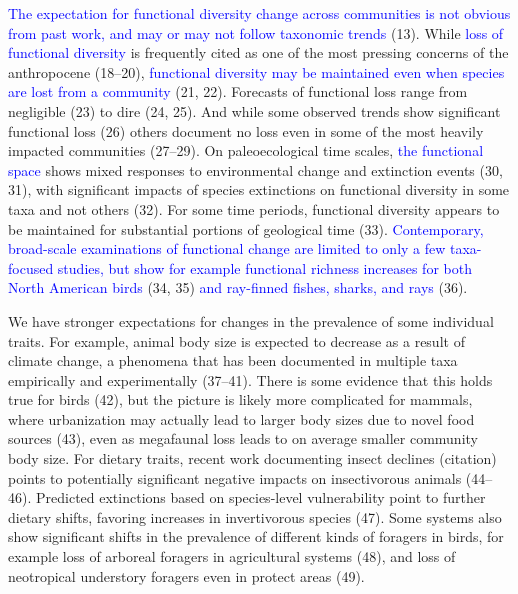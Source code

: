 \documentclass{article}
\begin{document}
\textcolor{blue}{The expectation for functional diversity change across communities is not obvious from past work, and may or may not follow taxonomic trends}
(13). While \textcolor{blue}{loss of functional diversity} is frequently
cited as one of the most pressing concerns of the anthropocene (18--20),
\textcolor{blue}{functional diversity may be maintained even when species are lost from a community}
(21, 22). Forecasts of functional loss range from negligible (23) to
dire (24, 25). And while some observed trends show significant
functional loss (26) others document no loss even in some of the most
heavily impacted communities (27--29). On paleoecological time scales,
\textcolor{blue}{the functional space} shows mixed responses to
environmental change and extinction events (30, 31), with significant
impacts of species extinctions on functional diversity in some taxa and
not others (32). For some time periods, functional diversity appears to
be maintained for substantial portions of geological time (33).
\textcolor{blue}{Contemporary, broad-scale examinations of functional change are limited to only a few taxa-focused studies, but show for example functional richness increases for both North American birds}
(34, 35) \textcolor{blue}{and ray-finned fishes, sharks, and rays} (36).

We have stronger expectations for changes in the prevalence of some
individual traits. For example, animal body size is expected to decrease
as a result of climate change, a phenomena that has been documented in
multiple taxa empirically and experimentally (37--41). There is some
evidence that this holds true for birds (42), but the picture is likely
more complicated for mammals, where urbanization may actually lead to
larger body sizes due to novel food sources (43), even as megafaunal
loss leads to on average smaller community body size. For dietary
traits, recent work documenting insect declines (citation) points to
potentially significant negative impacts on insectivorous animals
(44--46). Predicted extinctions based on species-level vulnerability
point to further dietary shifts, favoring increases in invertivorous
species (47). Some systems also show significant shifts in the
prevalence of different kinds of foragers in birds, for example loss of
arboreal foragers in agricultural systems (48), and loss of neotropical
understory foragers even in protect areas (49).
\end{document}
